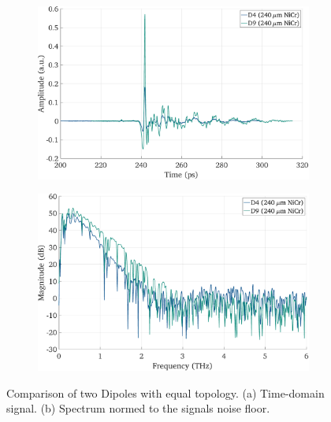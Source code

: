 \begin{figure}[h]
    \centering
    \begin{subfigure}[b]{0.485\textwidth}
        \centering
        \includegraphics[width=\textwidth]{figures/Results/D4_D9/D4_D9_time.pdf}
        \caption{}
    \end{subfigure}
    \hfill
    \begin{subfigure}[b]{0.485\textwidth}
        \centering
        \includegraphics[width=\textwidth]{figures/Results/D4_D9/D4_D9_spectrum_nn.pdf}
        \caption{}
    \end{subfigure}
    \caption{Comparison of two Dipoles with equal topology. (a) Time-domain signal. (b) Spectrum normed to the signals noise floor.}
\end{figure}

